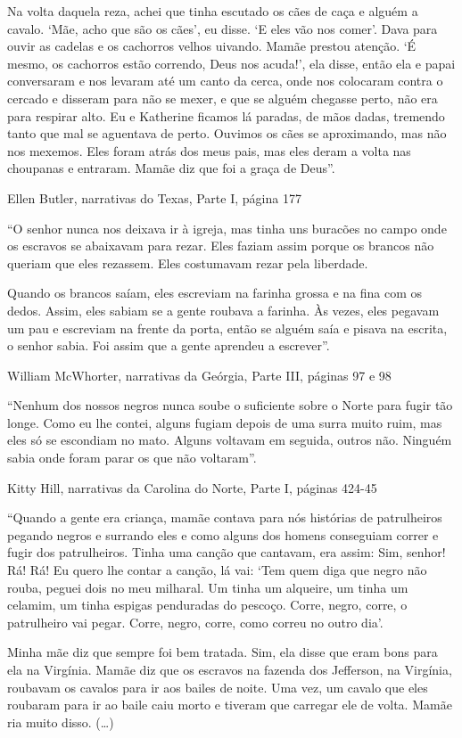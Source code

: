 Na volta daquela reza, achei que tinha escutado os cães de caça e alguém
a cavalo. `Mãe, acho que são os cães', eu disse. `E eles vão nos comer'.
Dava para ouvir as cadelas e os cachorros velhos uivando. Mamãe prestou
atenção. `É mesmo, os cachorros estão correndo, Deus nos acuda!', ela
disse, então ela e papai conversaram e nos levaram até um canto da
cerca, onde nos colocaram contra o cercado e disseram para não se mexer,
e que se alguém chegasse perto, não era para respirar alto. Eu e
Katherine ficamos lá paradas, de mãos dadas, tremendo tanto que mal se
aguentava de perto. Ouvimos os cães se aproximando, mas não nos mexemos.
Eles foram atrás dos meus pais, mas eles deram a volta nas choupanas e
entraram. Mamãe diz que foi a graça de Deus''.

Ellen Butler, narrativas do Texas, Parte I, página 177

``O senhor nunca nos deixava ir à igreja, mas tinha uns buracões no
campo onde os escravos se abaixavam para rezar. Eles faziam assim porque
os brancos não queriam que eles rezassem. Eles costumavam rezar pela
liberdade.

Quando os brancos saíam, eles escreviam na farinha grossa e na fina com
os dedos. Assim, eles sabiam se a gente roubava a farinha. Às vezes,
eles pegavam um pau e escreviam na frente da porta, então se alguém saía
e pisava na escrita, o senhor sabia. Foi assim que a gente aprendeu a
escrever''.

William McWhorter, narrativas da Geórgia, Parte III, páginas 97 e 98

``Nenhum dos nossos negros nunca soube o suficiente sobre o Norte para
fugir tão longe. Como eu lhe contei, alguns fugiam depois de uma surra
muito ruim, mas eles só se escondiam no mato. Alguns voltavam em
seguida, outros não. Ninguém sabia onde foram parar os que não
voltaram''.

Kitty Hill, narrativas da Carolina do Norte, Parte I, páginas 424-45

``Quando a gente era criança, mamãe contava para nós histórias de
patrulheiros pegando negros e surrando eles e como alguns dos homens
conseguiam correr e fugir dos patrulheiros. Tinha uma canção que
cantavam, era assim: Sim, senhor! Rá! Rá! Eu quero lhe contar a canção,
lá vai: `Tem quem diga que negro não rouba, peguei dois no meu milharal.
Um tinha um alqueire, um tinha um celamim, um tinha espigas penduradas
do pescoço. Corre, negro, corre, o patrulheiro vai pegar. Corre, negro,
corre, como correu no outro dia'.

Minha mãe diz que sempre foi bem tratada. Sim, ela disse que eram bons
para ela na Virgínia. Mamãe diz que os escravos na fazenda dos
Jefferson, na Virgínia, roubavam os cavalos para ir aos bailes de noite.
Uma vez, um cavalo que eles roubaram para ir ao baile caiu morto e
tiveram que carregar ele de volta. Mamãe ria muito disso. (\ldots{})


